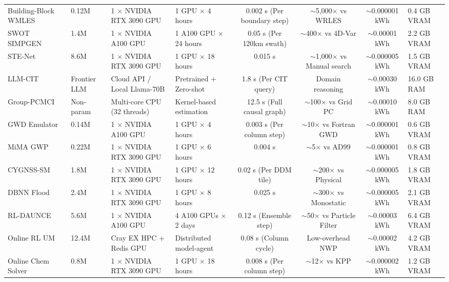 \begin{table}[t]
{\begin{tabular}{@{}llp{2.6cm}p{3.2cm}cccp{2.6cm}@{}}
Building-Block WMLES~\cite{lozano2023buildingblock} & 0.12M & 1 $\times$ NVIDIA RTX 3090 GPU & 1 GPU $\times$ 4 hours & 0.002 s (Per boundary step) & $\sim$5,000$\times$ vs WRLES & $\sim$0.000001 kWh & 0.4 GB VRAM \\
SWOT SIMPGEN~\cite{cutolo2025swot} & 1.4M & 1 $\times$ NVIDIA A100 GPU & 1 A100 GPU $\times$ 24 hours & 0.05 s (Per 120km swath) & $\sim$400$\times$ vs 4D-Var & $\sim$0.00001 kWh & 2.2 GB VRAM \\
STE-Net~\cite{wan2024ste} & 8.6M & 1 $\times$ NVIDIA RTX 3090 GPU & 1 GPU $\times$ 18 hours & 0.015 s & $\sim$1,000$\times$ vs Manual search & $\sim$0.000005 kWh & 1.5 GB VRAM \\
LLM-CIT~\cite{cohrs2024llmcausal} & Frontier LLM & Cloud API / Local Llama-70B & Pretrained + Zero-shot & 1.8 s (Per CIT query) & Domain reasoning & $\sim$0.00030 kWh & 16.0 GB RAM \\
Group-PCMCI~\cite{wahl2023groupcausal} & Non-param & Multi-core CPU (32 threads) & Kernel-based estimation & 12.5 s (Full causal graph) & $\sim$100$\times$ vs Grid PC & $\sim$0.00010 kWh & 8.0 GB RAM \\
GWD Emulator~\cite{chantry2021gravity} & 0.14M & 1 $\times$ NVIDIA A100 GPU & 1 GPU $\times$ 4 hours & 0.003 s (Per column step) & $\sim$10$\times$ vs Fortran GWD & $\sim$0.000001 kWh & 0.6 GB VRAM \\
MiMA GWP~\cite{espinosa2022gravity} & 0.22M & 1 $\times$ NVIDIA RTX 3090 GPU & 1 GPU $\times$ 6 hours & 0.004 s & $\sim$5$\times$ vs AD99 & $\sim$0.000001 kWh & 0.8 GB VRAM \\
CYGNSS-SM~\cite{nabi2023quasiglobal} & 1.8M & 1 $\times$ NVIDIA RTX 3090 GPU & 1 GPU $\times$ 12 hours & 0.02 s (Per DDM tile) & $\sim$200$\times$ vs Physical & $\sim$0.000005 kWh & 1.8 GB VRAM \\
DBNN Flood~\cite{song2022dualbranch} & 2.4M & 1 $\times$ NVIDIA RTX 3090 GPU & 1 GPU $\times$ 8 hours & 0.025 s & $\sim$300$\times$ vs Monostatic & $\sim$0.000005 kWh & 2.1 GB VRAM \\
RL-DAUNCE~\cite{behnoudfar2025rldaunce} & 5.6M & 1 $\times$ NVIDIA A100 GPU & 4 A100 GPUs $\times$ 2 days & 0.12 s (Ensemble step) & $\sim$50$\times$ vs Particle Filter & $\sim$0.00003 kWh & 6.4 GB VRAM \\
Online RL UM~\cite{nath2026online} & 12.4M & Cray EX HPC + Redis GPU & Distributed model-agent & 0.08 s (Column cycle) & Low-overhead NWP & $\sim$0.00002 kWh & 4.2 GB VRAM \\
Online Chem Solver~\cite{kelp2022online} & 0.8M & 1 $\times$ NVIDIA RTX 3090 GPU & 1 GPU $\times$ 18 hours & 0.008 s (Per column step) & $\sim$12$\times$ vs KPP & $\sim$0.000002 kWh & 1.2 GB VRAM \\

\end{tabular}}
\end{table}
